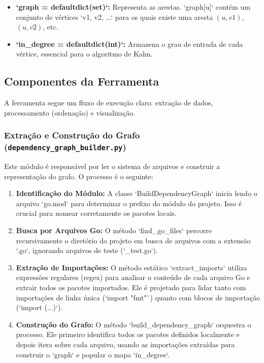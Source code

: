 \documentclass[12pt]{article}
\begin{document}
\begin{itemize}
    \item \textbf{`graph = defaultdict(set)`:} Representa as arestas. `graph[u]` contém um conjunto de vértices `{v1, v2, ...}` para os quais existe uma aresta $(u, v1)$, $(u, v2)$, etc.
    \item \textbf{`in\_degree = defaultdict(int)`:} Armazena o grau de entrada de cada vértice, essencial para o algoritmo de Kahn.
\end{itemize}

\subsection{Componentes da Ferramenta}
A ferramenta segue um fluxo de execução claro: extração de dados, processamento (ordenação) e visualização.

\subsubsection{Extração e Construção do Grafo (\texttt{dependency\_graph\_builder.py})}
Este módulo é responsável por ler o sistema de arquivos e construir a representação do grafo. O processo é o seguinte:
\begin{enumerate}
    \item \textbf{Identificação do Módulo:} A classe `BuildDependencyGraph` inicia lendo o arquivo `go.mod` para determinar o prefixo do módulo do projeto. Isso é crucial para nomear corretamente os pacotes locais.
    \item \textbf{Busca por Arquivos Go:} O método `find\_go\_files` percorre recursivamente o diretório do projeto em
        busca de arquivos com a extensão `.go`, ignorando arquivos de teste (`\_test.go`).
    \item \textbf{Extração de Importações:} O método estático `extract\_imports` utiliza expressões regulares (regex) para analisar o conteúdo de cada arquivo Go e extrair todos os pacotes importados. Ele é projetado para lidar tanto com importações de linha única (`import "fmt"`) quanto com blocos de importação (`import (...)`).
    \item \textbf{Construção do Grafo:} O método `build\_dependency\_graph` orquestra o processo. Ele primeiro
        identifica todos os pacotes definidos localmente e depois itera sobre cada arquivo, usando as importações
        extraídas para construir o `graph` e popular o mapa `in\_degree`.
\end{enumerate}
\end{document}
